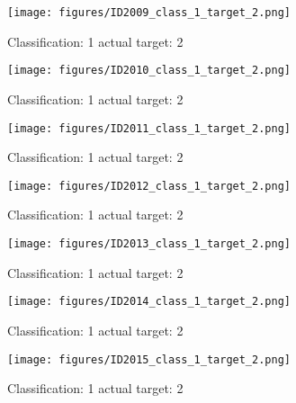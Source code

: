 \begin{figure}[h!]
\begin{center}
\texttt{[image: figures/ID2009\_class\_1\_target\_2.png]}
\end{center}
\caption{ Classification: 1 actual target: 2}
\label{fig:ID2009_class_1_target_2}
\end{figure}
\begin{figure}[h!]
\begin{center}
\texttt{[image: figures/ID2010\_class\_1\_target\_2.png]}
\end{center}
\caption{ Classification: 1 actual target: 2}
\label{fig:ID2010_class_1_target_2}
\end{figure}
\begin{figure}[h!]
\begin{center}
\texttt{[image: figures/ID2011\_class\_1\_target\_2.png]}
\end{center}
\caption{ Classification: 1 actual target: 2}
\label{fig:ID2011_class_1_target_2}
\end{figure}
\begin{figure}[h!]
\begin{center}
\texttt{[image: figures/ID2012\_class\_1\_target\_2.png]}
\end{center}
\caption{ Classification: 1 actual target: 2}
\label{fig:ID2012_class_1_target_2}
\end{figure}
\begin{figure}[h!]
\begin{center}
\texttt{[image: figures/ID2013\_class\_1\_target\_2.png]}
\end{center}
\caption{ Classification: 1 actual target: 2}
\label{fig:ID2013_class_1_target_2}
\end{figure}
\begin{figure}[h!]
\begin{center}
\texttt{[image: figures/ID2014\_class\_1\_target\_2.png]}
\end{center}
\caption{ Classification: 1 actual target: 2}
\label{fig:ID2014_class_1_target_2}
\end{figure}
\begin{figure}[h!]
\begin{center}
\texttt{[image: figures/ID2015\_class\_1\_target\_2.png]}
\end{center}
\caption{ Classification: 1 actual target: 2}
\label{fig:ID2015_class_1_target_2}
\end{figure}
